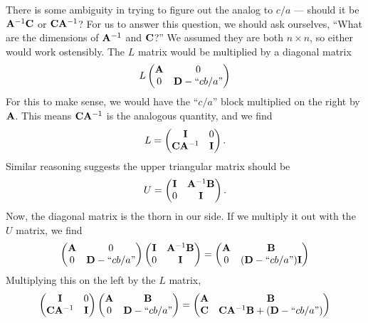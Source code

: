 There is some ambiguity in trying to figure out the analog to $c/a$ ---
should it be $\mathbf{A}^{-1}\mathbf{C}$ or $\mathbf{C}\mathbf{A}^{-1}$? For us to
answer this question, we should ask ourselves, ``What are the dimensions
of $\mathbf{A}^{-1}$ and $\mathbf{C}$?'' We assumed they are both $n\times n$,
so either would work ostensibly. The $L$ matrix would be multiplied by a
diagonal matrix
\begin{equation}
L\begin{pmatrix}
\mathbf{A} & 0\\
      0 & \mathbf{D} - \mbox{``$cb/a$''}
\end{pmatrix}
\end{equation}
For this to make sense, we would have the ``$c/a$'' block multiplied on
the right by $\mathbf{A}$. This means $\mathbf{C}\mathbf{A}^{-1}$ is the
analogous quantity, and we find
\begin{equation}
L = \begin{pmatrix}\mathbf{I} & 0\\\mathbf{C}\mathbf{A}^{-1} & \mathbf{I}
\end{pmatrix}.
\end{equation}
Similar reasoning suggests the upper triangular matrix should be
\begin{equation}
U = \begin{pmatrix}\mathbf{I} & \mathbf{A}^{-1}\mathbf{B}\\0 & \mathbf{I}
\end{pmatrix}.
\end{equation}
Now, the diagonal matrix is the thorn in our side. If we multiply it out
with the $U$ matrix, we find
\begin{equation}
\begin{pmatrix}
\mathbf{A} & 0\\
      0 & \mathbf{D} - \mbox{``$cb/a$''}
\end{pmatrix}\begin{pmatrix}\mathbf{I} & \mathbf{A}^{-1}\mathbf{B}\\0 & \mathbf{I}
\end{pmatrix}
= \begin{pmatrix}
\mathbf{A} & \mathbf{B}\\
0 & (\mathbf{D} - \mbox{``$cb/a$''})\mathbf{I}
\end{pmatrix}
\end{equation}
Multiplying this on the left by the $L$ matrix,
\begin{equation}
\begin{pmatrix}\mathbf{I} & 0\\\mathbf{C}\mathbf{A}^{-1} & \mathbf{I}
\end{pmatrix}\begin{pmatrix}
\mathbf{A} & \mathbf{B}\\
0 & \mathbf{D} - \mbox{``$cb/a$''}
\end{pmatrix} =\begin{pmatrix}
\mathbf{A} & \mathbf{B}\\
\mathbf{C} & \mathbf{C}\mathbf{A}^{-1}\mathbf{B} + (\mathbf{D} - \mbox{``$cb/a$''})
\end{pmatrix}
\end{equation}

